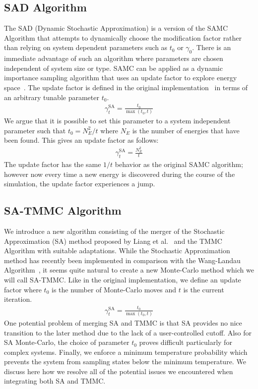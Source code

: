 \documentclass[letterpaper,twocolumn,amsmath,amssymb,pre,aps,10pt]{revtex4-1}
\begin{document}
\subsection{SAD Algorithm}
The SAD (Dynamic Stochastic Approximation) is a version of the SAMC
Algorithm that attempts to dynamically choose the modification factor
rather than relying on system dependent parameters such as $t_0$ or
$\gamma_0$.  There is an immediate advantage of such an algorithm where
parameters are chosen independent of system size or type. SAMC can be
applied as a dynamic importance sampling algorithm that uses an update
factor to explore energy space~\cite{liang2007stochastic,
werlich2015stochastic, schneider2017convergence}.  The update factor is
defined in the original implementation~\cite{liang2007stochastic} in
terms of an arbitrary tunable parameter $t_0$.
\begin{align}
\gamma_{t}^{\text{SA}} = \frac{t_0}{\max(t_0,t)}
\end{align}
We argue that it is possible to set this parameter to a system
independent parameter such that $t_0 = N_E^2/t$ where $N_E$ is the
number of energies that have been found.  This gives an update factor
as follows:
\begin{align}
\gamma_{t}^{\text{SA}} = \frac{N_E^2}{t}
\end{align}
The update factor has the same $1/t$ behavior as the original SAMC
algorithm; however now every time a new energy is discovered during the
course of the simulation, the update factor experiences a jump.

\subsection{SA-TMMC Algorithm} We introduce a new algorithm consisting
of the merger of the Stochastic Approximation (SA) method proposed by
Liang et al.~\cite{liang2007stochastic} and the TMMC Algorithm with
suitable adaptations.  While the Stochastic Approximation method has
recently been implemented in comparison with the Wang-Landau
Algorithm~\cite{werlich2015stochastic, schneider2017convergence}, it
seems quite natural to create a new Monte-Carlo method which we will
call SA-TMMC.  Like in the original implementation, we define an update
factor where $t_0$ is the number of Monte-Carlo moves and $t$ is the
current iteration. \begin{align} \gamma_{t}^{\text{SA}} =
\frac{t_0}{\max(t_0,t)} \end{align} One potential problem of merging SA
and TMMC is that SA provides no nice transition to the later method due
to the lack of a user-controlled cutoff.  Also for SA Monte-Carlo, the
choice of parameter $t_0$ proves difficult particularly for complex
systems.  Finally, we enforce a minimum temperature probability which
prevents the system from sampling states below the minimum temperature.
We discuss here how we resolve all of the potential issues we
encountered when integrating both SA and TMMC.
\end{document}

